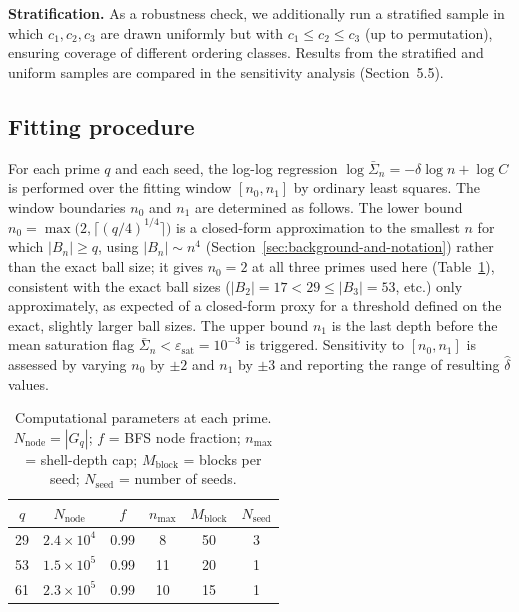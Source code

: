   \textbf{Stratification.}
  As a robustness check, we additionally run a stratified sample in which $c_1,c_2,c_3$
  are drawn uniformly but with $c_1\leq c_2\leq c_3$ (up to permutation), ensuring
  coverage of different ordering classes.
  Results from the stratified and uniform samples are compared in the sensitivity
  analysis (Section~5.5).

\subsection{Fitting procedure}
  \label{sec:fitting}

  For each prime $q$ and each seed, the log-log regression
  $\log\bar{\Sigma}_n = -\delta\log n + \log C$ is performed over the fitting window
  $[n_0,n_1]$ by ordinary least squares.
  The window boundaries $n_0$ and $n_1$ are determined as follows.
  The lower bound $n_0=\max\bigl(2,\lceil(q/4)^{1/4}\rceil\bigr)$ is a closed-form
  approximation to the smallest $n$ for which $|B_n|\geq q$, using $|B_n|\sim n^4$
  (Section~\ref{sec:background-and-notation}) rather than the exact ball size; it gives
  $n_0=2$ at all three primes used here (Table~\ref{tab:params}), consistent with the exact
  ball sizes ($|B_2|=17 < 29 \leq |B_3|=53$, etc.) only approximately, as expected of a
  closed-form proxy for a threshold defined on the exact, slightly larger ball sizes.
  The upper bound $n_1$ is the last depth before the mean saturation flag
  $\bar{\Sigma}_n < \varepsilon_{\mathrm{sat}}=10^{-3}$ is triggered.
  Sensitivity to $[n_0,n_1]$ is assessed by varying $n_0$ by $\pm 2$ and $n_1$
  by $\pm 3$ and reporting the range of resulting $\hat{\delta}$ values.

  \begin{table}[ht]
    \centering
    \caption{Computational parameters at each prime.
      $N_{\mathrm{node}}=|G_q|$; $f$ = BFS node fraction;
      $n_{\max}$ = shell-depth cap; $M_{\mathrm{block}}$ = blocks per seed;
      $N_{\mathrm{seed}}$ = number of seeds.}
    \label{tab:params}
    \begin{tabular}{cccccc}
      \hline
      $q$ & $N_{\mathrm{node}}$ & $f$  & $n_{\max}$ & $M_{\mathrm{block}}$ & $N_{\mathrm{seed}}$ \\
      \hline
      29 & $2.4\times 10^4$    & 0.99 & 8  & 50 & 3 \\
      53 & $1.5\times 10^5$    & 0.99 & 11 & 20 & 1 \\
      61 & $2.3\times 10^5$    & 0.99 & 10 & 15 & 1 \\
      \hline
    \end{tabular}
  \end{table}
